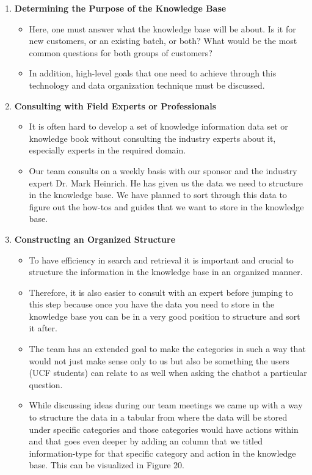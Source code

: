 \documentclass[titlepage, 12pt]{article}
\begin{document}
\begin{enumerate}
    \item \textbf{Determining the Purpose of the Knowledge Base}
    \begin{itemize}
        \item Here, one must answer what the knowledge base will be about. Is it for new customers, or an existing batch, or both? What would be the most common questions for both groups of customers?
        \item In addition, high-level goals that one need to achieve through this technology and data organization technique must be discussed.
    \end{itemize}
    \item \textbf{Consulting with Field Experts or Professionals}
    \begin{itemize}
        \item It is often hard to develop a set of knowledge information data set or knowledge book without consulting the industry experts about it, especially experts in the required domain.
        \item Our team consults on a weekly basis with our sponsor and the industry expert Dr. Mark Heinrich. He has given us the data we need to structure in the knowledge base. We have planned to sort through this data to figure out the how-tos and guides that we want to store in the knowledge base.
    \end{itemize}
    \item \textbf{Constructing an Organized Structure}
    \begin{itemize}
        \item To have efficiency in search and retrieval it is important and crucial to structure the information in the knowledge base in an organized manner.
        \item Therefore, it is also easier to consult with an expert before jumping to this step because once you have the data you need to store in the knowledge base you can be in a very good position to structure and sort it after.
        \item The team has an extended goal to make the categories in such a way that would not just make sense only to us but also be something the users (UCF students) can relate to as well when asking the chatbot a particular question.
        \item While discussing ideas during our team meetings we came up with a way to structure the data in a tabular from where the data will be stored under specific categories and those categories would have actions within and that goes even deeper by adding an column that we titled information-type for that specific category and action in the knowledge base. This can be visualized in Figure 20.

\end{itemize}
\end{enumerate}
\end{document}
